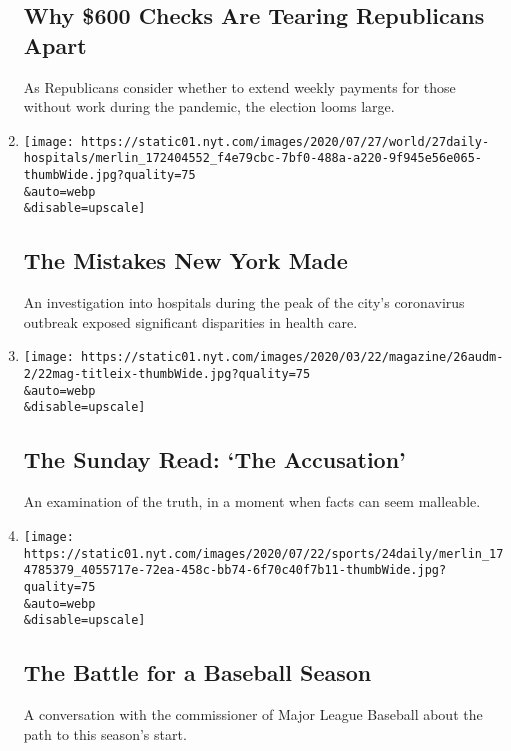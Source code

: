 \begin{enumerate}
  \hypertarget{why-600-checks-are-tearing-republicans-apart}{%
  \subsection{Why \$600 Checks Are Tearing Republicans
  Apart}\label{why-600-checks-are-tearing-republicans-apart}}

  As Republicans consider whether to extend weekly payments for those
  without work during the pandemic, the election looms large.
\item
  \href{/2020/07/27/podcasts/the-daily/new-york-hospitals-covid.html}{}

  \texttt{[image: https://static01.nyt.com/images/2020/07/27/world/27daily-hospitals/merlin\_172404552\_f4e79cbc-7bf0-488a-a220-9f945e56e065-thumbWide.jpg?quality=75\\\&auto=webp\\\&disable=upscale]}

  \hypertarget{the-mistakes-new-york-made}{%
  \subsection{The Mistakes New York
  Made}\label{the-mistakes-new-york-made}}

  An investigation into hospitals during the peak of the city's
  coronavirus outbreak exposed significant disparities in health care.
\item
  \href{/2020/07/26/podcasts/the-daily/the-accusation-the-sunday-read.html}{}

  \texttt{[image: https://static01.nyt.com/images/2020/03/22/magazine/26audm-2/22mag-titleix-thumbWide.jpg?quality=75\\\&auto=webp\\\&disable=upscale]}

  \hypertarget{the-sunday-read-the-accusation}{%
  \subsection{The Sunday Read: `The
  Accusation'}\label{the-sunday-read-the-accusation}}

  An examination of the truth, in a moment when facts can seem
  malleable.
\item
  \href{/2020/07/24/podcasts/the-daily/mlb-baseball-season-coronavirus.html}{}

  \texttt{[image: https://static01.nyt.com/images/2020/07/22/sports/24daily/merlin\_174785379\_4055717e-72ea-458c-bb74-6f70c40f7b11-thumbWide.jpg?quality=75\\\&auto=webp\\\&disable=upscale]}

  \hypertarget{the-battle-for-a-baseball-season}{%
  \subsection{The Battle for a Baseball
  Season}\label{the-battle-for-a-baseball-season}}

  A conversation with the commissioner of Major League Baseball about
  the path to this season's start.
\end{enumerate}

